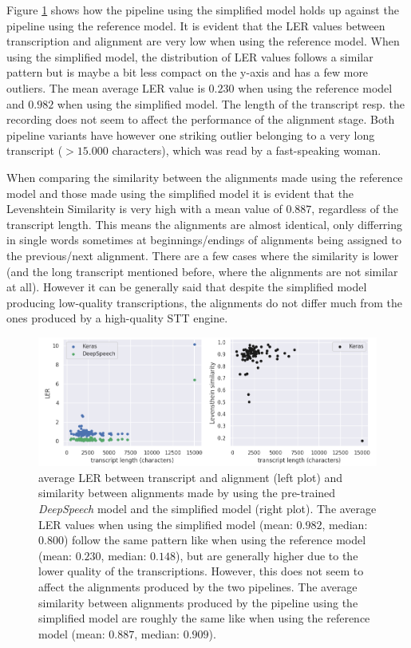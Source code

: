 Figure \ref{pipeline_scatterplot_ls_en} shows how the pipeline using the simplified model holds up against the pipeline using the reference model. It is evident that the \ac{LER} values between transcription and alignment are very low when using the reference model. When using the simplified model, the distribution of \ac{LER} values follows a similar pattern but is maybe a bit less compact on the y-axis and has a few more outliers. The mean average \ac{LER} value is $0.230$ when using the reference model and $0.982$ when using the simplified model. The length of the transcript resp. the recording does not seem to affect the performance of the alignment stage. Both pipeline variants have however one striking outlier belonging to a very long transcript ($>15.000$ characters), which was read by a fast-speaking woman. 

When comparing the similarity between the alignments made using the reference model and those made using the simplified model it is evident that the Levenshtein Similarity is very high with a mean value of $0.887$, regardless of the transcript length. This means the alignments are almost identical, only differring in single words sometimes at beginnings/endings of alignments being assigned to the previous/next alignment. There are a few cases where the similarity is lower (and the long transcript mentioned before, where the alignments are not similar at all). However it can be generally said that despite the simplified model producing low-quality transcriptions, the alignments do not differ much from the ones produced by a high-quality \ac{STT} engine.

\begin{figure}[h!]
	\includegraphics[width=\linewidth]{./img/scatterplot_ls.png}
	\caption{average \ac{LER} between transcript and alignment (left plot) and similarity between alignments made by using the pre-trained \textit{DeepSpeech} model and the simplified model (right plot). The average \ac{LER} values when using the simplified model (mean: $0.982$, median: $0.800$) follow the same pattern like when using the reference model (mean: $0.230$, median: $0.148$), but are generally higher due to the lower quality of the transcriptions. However, this does not seem to affect the alignments produced by the two pipelines. The average similarity between alignments produced by the pipeline using the simplified model are roughly the same like when using the reference model (mean: $0.887$, median: $0.909$).}
	\label{pipeline_scatterplot_ls_en}
\end{figure}

